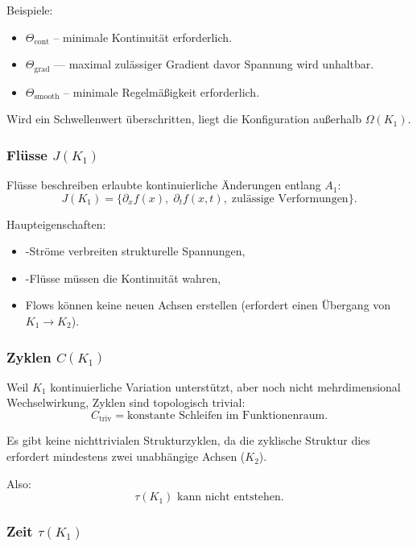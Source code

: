 Beispiele:
\begin{itemize}
    \item $\Theta_{\mathrm{cont}}$ – minimale Kontinuität erforderlich.
    \item $\Theta_{\mathrm{grad}}$ — maximal zulässiger Gradient davor
          Spannung wird unhaltbar.
    \item $\Theta_{\mathrm{smooth}}$ – minimale Regelmäßigkeit erforderlich.
\end{itemize}

Wird ein Schwellenwert überschritten, liegt die Konfiguration außerhalb
$\Omega(K_1)$.

\subsubsection{Flüsse \texorpdfstring{$J(K_1)$}{J(K_1)}}

Flüsse beschreiben erlaubte kontinuierliche Änderungen entlang $A_1$:
\[
J(K_1) = \{ \partial_x f(x),\; \partial_t f(x,t),\; \text{zulässige Verformungen} \}.
\]

Haupteigenschaften:
\begin{itemize}
    \item-Ströme verbreiten strukturelle Spannungen,
    \item-Flüsse müssen die Kontinuität wahren,
    \item Flows können keine neuen Achsen erstellen (erfordert einen Übergang von $K_1\to K_2$).
\end{itemize}

\subsubsection{Zyklen \texorpdfstring{$C(K_1)$}{C(K_1)}}

Weil $K_1$ kontinuierliche Variation unterstützt, aber noch nicht mehrdimensional
Wechselwirkung, Zyklen sind topologisch trivial:
\[
C_{\mathrm{triv}} = \text{konstante Schleifen im Funktionenraum}.
\]

Es gibt keine nichttrivialen Strukturzyklen, da die zyklische Struktur dies erfordert
mindestens zwei unabhängige Achsen ($K_2$).

Also:
\[
\tau(K_1) \text{ kann nicht entstehen.}
\]

\subsubsection{Zeit \texorpdfstring{$\tau(K_1)$}{\tau(K_1)}}

